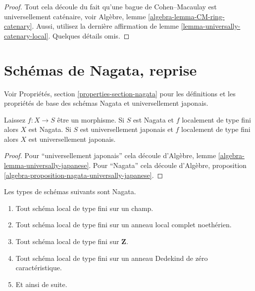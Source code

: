 \begin{proof}
Tout cela découle du fait qu'une bague de Cohen--Macaulay est universellement caténaire, voir Algèbre, lemme \ref{algebra-lemma-CM-ring-catenary}. Aussi, utilisez la dernière affirmation de lemme \ref{lemma-universally-catenary-local}. Quelques détails omis.
\end{proof}























\section{Schémas de Nagata, reprise}
\label{section-nagata}

\noindent
Voir Propriétés, section \ref{properties-section-nagata} pour les définitions et les propriétés de base des schémas Nagata et universellement japonais.

\begin{lemma}

\label{lemma-finite-type-nagata}
Laissez $f : X \to S$ être un morphisme. Si $S$ est Nagata et $f$ localement de type fini alors $X$ est Nagata. Si $S$ est universellement japonais et $f$ localement de type fini alors $X$ est universellement japonais.
\end{lemma}

\begin{proof}
Pour ``universellement japonais'' cela découle d'Algèbre, lemme \ref{algebra-lemma-universally-japanese}. Pour ``Nagata'' cela découle d'Algèbre, proposition \ref{algebra-proposition-nagata-universally-japanese}.
\end{proof}

\begin{lemma}

\label{lemma-ubiquity-nagata}
Les types de schémas suivants sont Nagata.
\begin{enumerate}
\item Tout schéma local de type fini sur un champ.
\item Tout schéma local de type fini sur un anneau local complet noethérien.
\item Tout schéma local de type fini sur $\mathbf{Z}$.
\item Tout schéma local de type fini sur un anneau Dedekind de zéro caractéristique.
\item Et ainsi de suite.
\end{enumerate}

\end{lemma}

